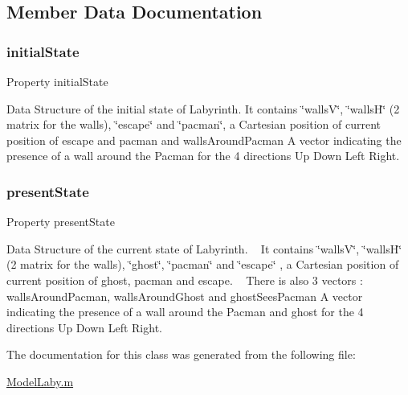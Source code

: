 \subsection{Member Data Documentation}
\mbox{\label{class_model_laby_acd9263acfa96c9138afdf497e55acc24}} 
\subsubsection{\texorpdfstring{initial\+State}{initialState}}
{\footnotesize\ttfamily Property initial\+State}



Data Structure of the initial state of Labyrinth. It contains \char`\"{}walls\+V\char`\"{}, \char`\"{}walls\+H\char`\"{} (2 matrix for the walls), \char`\"{}escape\char`\"{} and \char`\"{}pacman\char`\"{}, a Cartesian position of current position of escape and pacman and \textquotesingle{}walls\+Around\+Pacman\textquotesingle{} A vector indicating the presence of a wall around the Pacman for the 4 directions Up Down Left Right. 

\mbox{\label{class_model_laby_a9624cc7c421a50fa5086b0ebd0cd5fe3}} 
\subsubsection{\texorpdfstring{present\+State}{presentState}}
{\footnotesize\ttfamily Property present\+State}



Data Structure of the current state of Labyrinth. ~\newline
 It contains \char`\"{}walls\+V\char`\"{}, \char`\"{}walls\+H\char`\"{} (2 matrix for the walls), \char`\"{}ghost\char`\"{}, \char`\"{}pacman\char`\"{} and \char`\"{}escape\char`\"{} , a Cartesian position of current position of ghost, pacman and escape. ~\newline
 There is also 3 vectors \+: \textquotesingle{}walls\+Around\+Pacman\textquotesingle{}, \textquotesingle{}walls\+Around\+Ghost\textquotesingle{} and \textquotesingle{}ghost\+Sees\+Pacman\textquotesingle{} A vector indicating the presence of a wall around the Pacman and ghost for the 4 directions Up Down Left Right. 



The documentation for this class was generated from the following file\+:\begin{DoxyCompactItemize}
\item 
\hyperlink{_model_laby_8m}{Model\+Laby.\+m}\end{DoxyCompactItemize}
